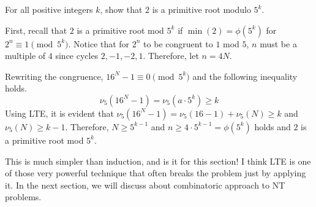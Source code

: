 \documentclass[../../../main.tex]{subfiles}
\begin{document}
\begin{problem}{}{}
For all positive integers $k$, show that $2$ is a primitive root
modulo $5^k$.
\end{problem}
\begin{solution}
First, recall that $2$ is a primitive root mod $5^k$ if
$\min(2) = \phi(5^k)$ for $2^n \equiv 1 \pmod{5^k}$. Notice that
for $2^n$ to be congruent to $1$ mod $5$, $n$ must be a multiple
of $4$ since cycles $2, -1, -2, 1$. Therefore, let $n = 4N$.

Rewriting the congruence, $16^N - 1 \equiv 0 \pmod{5^k}$ and
the following inequality holds.
\[
\nu_5 \left( 16^N - 1 \right)
= \nu_5 \left( a \cdot 5^k \right)
\geq k
\]
Using LTE, it is evident that $\nu_5 \left( 16^N - 1 \right) =
\nu_5 (16 - 1) + \nu_5 (N) \geq k$ and $\nu_5 (N) \geq k - 1$.
Therefore, $N \geq 5^{k-1}$ and $n \geq 4 \cdot 5^{k-1} = \phi(5^k)$
holds and $2$ is a primitive root mod $5^k$.
\end{solution}

This is much simpler than induction, and is it for this section!
I think LTE is one of those very powerful technique that often
breaks the problem just by applying it. In the next section,
we will discuss about combinatoric approach to NT problems.
\end{document}
